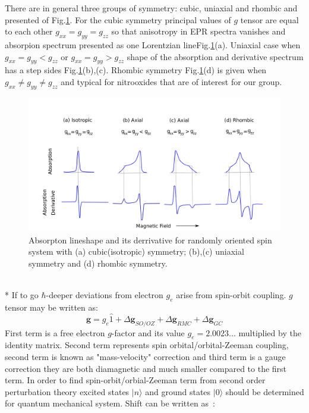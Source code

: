 There are in general three groups of symmetry: cubic, uniaxial and rhombic and presented of Fig.\ref{figure:gsym}. For the cubic symmetry principal values of $g$ tensor are equal to each other $g_{xx}=g_{yy}=g_{zz}$ so that anisotropy in EPR spectra vanishes and absorpion spectrum presented as one Lorentzian lineFig.\ref{figure:gsym}(a). Uniaxial case when $g_{xx}=g_{yy}<g_{zz}$ or $g_{xx}=g_{yy}>g_{zz}$ shape of the absorption and derivative spectrum has a step sides Fig.\ref{figure:gsym}(b),(c). Rhombic symmetry Fig.\ref{figure:gsym}(d) is given when $g_{xx}\neq g_{yy}\neq g_{zz}$ and typical for nitrooxides that are of interest for our group. 
\begin{figure}[h!]
\begin{center}
\includegraphics[width=1\textwidth]{figures/chap1/gten1.png}
\caption{Absorpton lineshape and its derrivative for randomly oriented spin system with (a) cubic(isotropic) symmetry; (b),(c) uniaxial symmetry and (d) rhombic symmetry.}
\label{figure:gsym}
\end{center}
\end{figure}
\\*
If to go $\hbar$-deeper deviations from electron $g_e$ arise from spin-orbit coupling.  $g$ tensor may be written as:
\begin{equation}\label{eq:gtenelec}
\pmb{g}=g_e\hat1+\Delta \pmb{g}_{SO/OZ}+\Delta\pmb{g}_{RMC}+\Delta\pmb{g}_{GC}
\end{equation} 
First term is a free electron $g$-factor and its value $g_e=2.0023...$ multiplied by the identity matrix. Second term represents spin orbital/orbital-Zeeman coupling, second term is known as "mass-velocity" correction and third term is a gauge correction they are both diamagnetic and much smaller compared to the first term. In order to find spin-orbit/orbial-Zeeman term from second order perturbation theory excited states $|n\rangle$ and ground states $|0\rangle$ should be determined for quantum mechanical system. Shift can be written as~\cite{thesis1}:  
